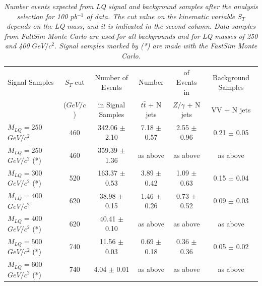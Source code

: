 \documentclass{cmspaper}
\begin{document}
\begin{linenumbers}
\begin{table}[htbp]
\begin{center}
\begin{tabular}{|lcc||ccc|}
\hline\hline
Signal Samples       & $S_T$ cut       & Number of Events     & Number              & of Events in           & Background Samples     \\
                     & ($GeV/c$)           & in Signal Samples    & $t\bar{t}$ + N jets & $Z/\gamma$ + N jets &  VV + N jets \\ 
\hline
$M_{LQ}=250~$$GeV/c^2$     & 460             & 342.06 $\pm$ 2.10    & 7.18  $\pm$ 0.57    & 2.55  $\pm$ 0.96    & 0.21 $\pm$ 0.05 \\ 
$M_{LQ}=250~$$GeV/c^2$ (*) & 460             & 359.39 $\pm$ 1.36    & as above            & as above            &  as above        \\
$M_{LQ}=300~$$GeV/c^2$ (*) & 520             & 163.37 $\pm$ 0.53    & 3.89  $\pm$ 0.42    & 1.09  $\pm$ 0.63    &  0.15 $\pm$ 0.04 \\ 
$M_{LQ}=400~$$GeV/c^2$     & 620             &  38.98 $\pm$ 0.15    & 1.46  $\pm$ 0.26    & 0.73  $\pm$ 0.52    &  0.09 $\pm$ 0.03 \\ 
$M_{LQ}=400~$$GeV/c^2$ (*) & 620             &  40.41 $\pm$ 0.10    & as above            & as above            &  as above        \\
$M_{LQ}=500~$$GeV/c^2$ (*) & 740             &  11.56 $\pm$ 0.03    & 0.69  $\pm$ 0.18    & 0.36  $\pm$ 0.36    &  0.05 $\pm$ 0.02 \\ 
$M_{LQ}=600~$$GeV/c^2$ (*) & 740             &   4.04 $\pm$ 0.01    & as above            & as above            &  as above        \\
\hline\hline
\end{tabular}
\end{center}
\caption{\small \sl Number events expected from LQ signal and background samples after the analysis selection for 100 pb$^{-1}$ of data.
The cut value on the kinematic variable $S_T$ depends on the LQ mass, and it is indicated in the second column.
Data samples from FullSim Monte Carlo are used for all backgrounds and for LQ masses of 250 and 400 $GeV/c^2$. 
Signal samples marked by (*) are made with the FastSim Monte Carlo. } 
\label{tab:EventSelSummary}
\end{table}


\end{linenumbers}
\end{document}
